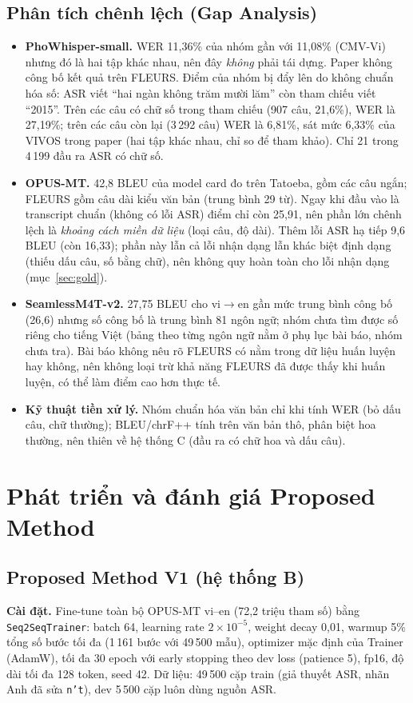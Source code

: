 \documentclass[12pt,a4paper]{article}
\begin{document}
\subsection{Phân tích chênh lệch (Gap Analysis)}\label{sec:gap}
\begin{itemize}[nosep]
\item \textbf{PhoWhisper-small.} WER 11,36\% của nhóm gần với 11,08\% (CMV-Vi) nhưng đó là hai tập khác nhau, nên đây \emph{không} phải tái dựng. Paper không công bố kết quả trên FLEURS. Điểm của nhóm bị đẩy lên do không chuẩn hóa số: ASR viết ``hai ngàn không trăm mười lăm'' còn tham chiếu viết ``2015''. Trên các câu có chữ số trong tham chiếu (907 câu, 21,6\%), WER là 27,19\%; trên các câu còn lại (3\,292 câu) WER là 6,81\%, sát mức 6,33\% của VIVOS trong paper (hai tập khác nhau, chỉ so để tham khảo). Chỉ 21 trong 4\,199 đầu ra ASR có chữ số.
\item \textbf{OPUS-MT.} 42,8 BLEU của model card đo trên Tatoeba, gồm các câu ngắn; FLEURS gồm câu dài kiểu văn bản (trung bình 29 từ). Ngay khi đầu vào là transcript chuẩn (không có lỗi ASR) điểm chỉ còn 25,91, nên phần lớn chênh lệch là \emph{khoảng cách miền dữ liệu} (loại câu, độ dài). Thêm lỗi ASR hạ tiếp 9,6 BLEU (còn 16,33); phần này lẫn cả lỗi nhận dạng lẫn khác biệt định dạng (thiếu dấu câu, số bằng chữ), nên không quy hoàn toàn cho lỗi nhận dạng (mục~\ref{sec:gold}).
\item \textbf{SeamlessM4T-v2.} 27,75 BLEU cho vi$\rightarrow$en gần mức trung bình công bố (26,6) nhưng số công bố là trung bình 81 ngôn ngữ; nhóm chưa tìm được số riêng cho tiếng Việt (bảng theo từng ngôn ngữ nằm ở phụ lục bài báo, nhóm chưa tra). Bài báo không nêu rõ FLEURS có nằm trong dữ liệu huấn luyện hay không, nên không loại trừ khả năng FLEURS đã được thấy khi huấn luyện, có thể làm điểm cao hơn thực tế.
\item \textbf{Kỹ thuật tiền xử lý.} Nhóm chuẩn hóa văn bản chỉ khi tính WER (bỏ dấu câu, chữ thường); BLEU/chrF++ tính trên văn bản thô, phân biệt hoa thường, nên thiên về hệ thống C (đầu ra có chữ hoa và dấu câu).
\end{itemize}

\section{Phát triển và đánh giá Proposed Method}
\subsection{Proposed Method V1 (hệ thống B)}\label{sec:v1}
\textbf{Cài đặt.} Fine-tune toàn bộ OPUS-MT vi--en (72,2 triệu tham số) bằng \texttt{Seq2SeqTrainer}: batch 64, learning rate $2\times10^{-5}$, weight decay 0,01, warmup 5\% tổng số bước tối đa (1\,161 bước với 49\,500 mẫu), optimizer mặc định của Trainer (AdamW), tối đa 30 epoch với early stopping theo dev loss (patience 5), fp16, độ dài tối đa 128 token, seed 42. Dữ liệu: 49\,500 cặp train (giả thuyết ASR, nhãn Anh đã sửa \texttt{n't}), dev 5\,500 cặp luôn dùng nguồn ASR.
\end{document}
